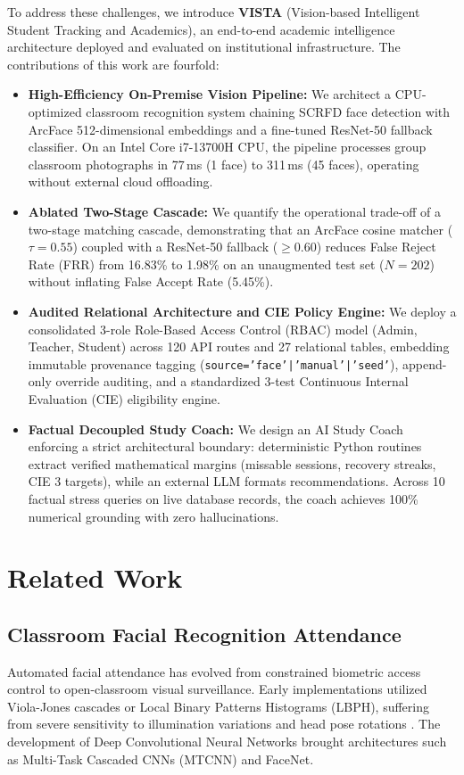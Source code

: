 \documentclass[conference]{IEEEtran}
\begin{document}
To address these challenges, we introduce \textbf{VISTA} (Vision-based Intelligent Student Tracking and Academics), an end-to-end academic intelligence architecture deployed and evaluated on institutional infrastructure. The contributions of this work are fourfold:
\begin{itemize}
    \item \textbf{High-Efficiency On-Premise Vision Pipeline:} We architect a CPU-optimized classroom recognition system chaining SCRFD face detection with ArcFace 512-dimensional embeddings and a fine-tuned ResNet-50 fallback classifier. On an Intel Core i7-13700H CPU, the pipeline processes group classroom photographs in 77\,ms (1 face) to 311\,ms (45 faces), operating without external cloud offloading.
    \item \textbf{Ablated Two-Stage Cascade:} We quantify the operational trade-off of a two-stage matching cascade, demonstrating that an ArcFace cosine matcher ($\tau=0.55$) coupled with a ResNet-50 fallback ($\ge 0.60$) reduces False Reject Rate (FRR) from 16.83\% to 1.98\% on an unaugmented test set ($N=202$) without inflating False Accept Rate (5.45\%).
    \item \textbf{Audited Relational Architecture and CIE Policy Engine:} We deploy a consolidated 3-role Role-Based Access Control (RBAC) model (Admin, Teacher, Student) across 120 API routes and 27 relational tables, embedding immutable provenance tagging (\texttt{source='face'|'manual'|'seed'}), append-only override auditing, and a standardized 3-test Continuous Internal Evaluation (CIE) eligibility engine.
    \item \textbf{Factual Decoupled Study Coach:} We design an AI Study Coach enforcing a strict architectural boundary: deterministic Python routines extract verified mathematical margins (missable sessions, recovery streaks, CIE 3 targets), while an external LLM formats recommendations. Across 10 factual stress queries on live database records, the coach achieves 100\% numerical grounding with zero hallucinations.
\end{itemize}

\section{Related Work}

\subsection{Classroom Facial Recognition Attendance}
Automated facial attendance has evolved from constrained biometric access control to open-classroom visual surveillance. Early implementations utilized Viola-Jones cascades or Local Binary Patterns Histograms (LBPH), suffering from severe sensitivity to illumination variations and head pose rotations \cite{deng2019arcface}. The development of Deep Convolutional Neural Networks brought architectures such as Multi-Task Cascaded CNNs (MTCNN) and FaceNet. 
\end{document}
